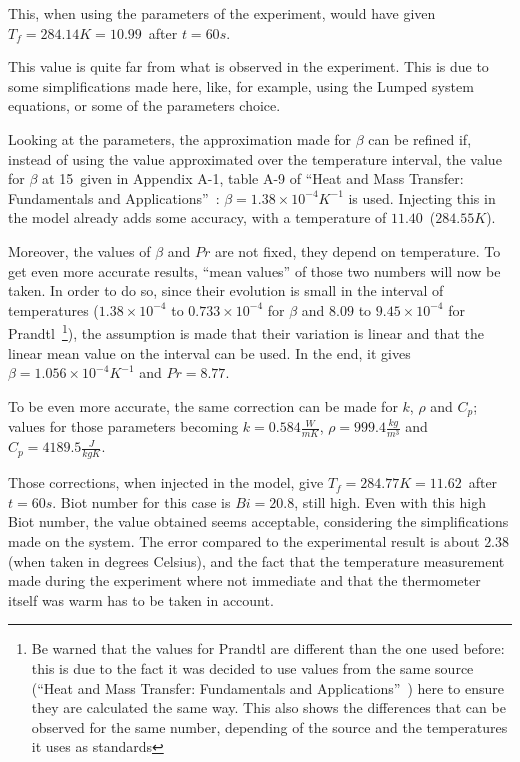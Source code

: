 \documentclass{report}
\begin{document}
	This, when using the parameters of the experiment, would have given $T_f=284.14K=10.99$\textcelsius\ after $t=60s$.
	
	This value is quite far from what is observed in the experiment. This is due to some simplifications made here, like, for example, using the Lumped system equations, or some of the parameters choice.
	
	Looking at the parameters, the approximation made for $\beta$ can be refined if, instead of using the value approximated over the temperature interval, the value for $\beta$ at 15\textcelsius\ given in Appendix A-1, table A-9 of ``Heat and Mass Transfer: Fundamentals and Applications''~\cite{HaMT}: $\beta=1.38\times 10^{-4} K^{-1}$ is used. Injecting this in the model already adds some accuracy, with a temperature of $11.40$\textcelsius\ ($284.55K$).
	
	Moreover, the values of $\beta$ and $Pr$ are not fixed, they depend on temperature. To get even more accurate results, ``mean values'' of those two numbers will now be taken. In order to do so, since their evolution is small in the interval of temperatures ($1.38\times 10^{-4}$ to $0.733\times 10^{-4}$ for $\beta$ and $8.09$ to $9.45\times 10^{-4}$ for Prandtl~\footnote{Be warned that the values for Prandtl are different than the one used before: this is due to the fact it was decided to use values from the same source (``Heat and Mass Transfer: Fundamentals and Applications''~\cite{HaMT}) here to ensure they are calculated the same way. This also shows the differences that can be observed for the same number, depending of the source and the temperatures it uses as standards}), the assumption is made that their variation is linear and that the linear mean value on the interval can be used. In the end, it gives $\beta=1.056\times 10^{-4} K^{-1}$ and $Pr=8.77$.
	
	To be even more accurate, the same correction can be made for $k$, $\rho$ and $C_p$; values for those parameters becoming $k=0.584\frac{W}{mK}$, $\rho=999.4\frac{kg}{m^3}$ and $C_p=4189.5\frac{J}{kgK}$.
	
	Those corrections, when injected in the model, give $T_f=284.77K=11.62$\textcelsius\ after $t=60s$. Biot number for this case is $Bi=20.8$, still high. Even with this high Biot number, the value obtained seems acceptable, considering the simplifications made on the system. The error compared to the experimental result is about $2.38$\textdiscount (when taken in degrees Celsius), and the fact that the temperature measurement made during the experiment where not immediate and that the thermometer itself was warm has to be taken in account.
	
\end{document}
